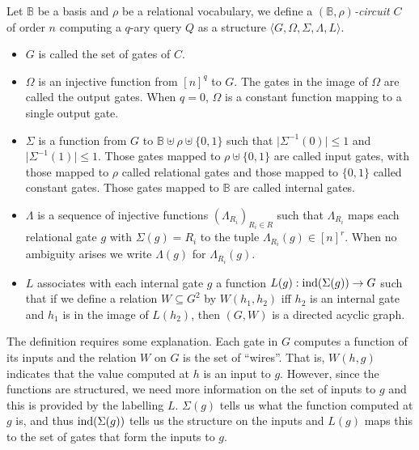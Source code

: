 \documentclass[../paper.tex]{subfiles}
\begin{document}
\begin{definition}
  Let $\mathbb{B}$ be a basis and $\rho$ be a relational vocabulary, we define a
  \emph{$(\mathbb{B}, \rho)$-circuit} $C$ of order $n$ computing a $q$-ary query
  $Q$ as a structure $\langle G, \Omega, \Sigma, \Lambda, L \rangle$.
  \begin{itemize}
    \setlength\itemsep{0mm}
  \item $G$ is called the set of gates of $C$.%
  \item $\Omega$ is an injective function from $[n]^q$ to $G$. The gates in the
    image of $\Omega$ are called the output gates. When $q = 0$, $\Omega$ is a
    constant function mapping to a single output gate.
  \item $\Sigma$ is a function from $G$ to $\mathbb{B} \uplus \rho \uplus
    \{0,1\} $ such that $\vert \Sigma^{-1} (0) \vert \leq 1$ and $\vert
    \Sigma^{-1} (1) \vert \leq 1$. Those gates mapped to $\rho \uplus \{0,1\}$
    are called input gates, with those mapped to $\rho$ called relational gates
    and those mapped to $\{0,1\}$ called constant gates. Those gates mapped to
    $\mathbb{B}$ are called internal gates.
  \item $\Lambda$ is a sequence of injective functions $(\Lambda_{R_i})_{R_i \in
      R}$ such that $\Lambda_{R_i}$ maps each relational gate $g$ with $\Sigma
    (g) = R_i$ to the tuple $\Lambda_{R_i} (g) \in [n]^{r}$. When no ambiguity
    arises we write $\Lambda (g)$ for $\Lambda_{R_i} (g)$.
  \item $L$ associates with each internal gate $g$ a function $L(g):
    \text{\upshape ind}(\Sigma(g)) \rightarrow G$ such that if we define a relation $W
    \subseteq G^{2}$ by $W(h_1,h_2)$ iff $h_2$ is an internal gate and $h_1$ is
    in the image of $L(h_2)$, then $(G, W)$ is a directed acyclic graph.
  \end{itemize}
\end{definition}

The definition requires some explanation.  Each gate in $G$ computes a
function of its inputs and the relation $W$ on $G$ is the set of
``wires''.  That is, $W(h,g)$ indicates that the value computed at $h$
is an input to $g$.  However, since the functions are structured, we
need more information on the set of inputs to $g$ and this is provided
by the labelling $L$.  $\Sigma(g)$ tells us what the function computed
at $g$ is, and thus $\text{\upshape ind}(\Sigma(g))$ tells us the structure on the
inputs and $L(g)$ maps this to the set of gates that form the inputs
to $g$.
\end{document}
